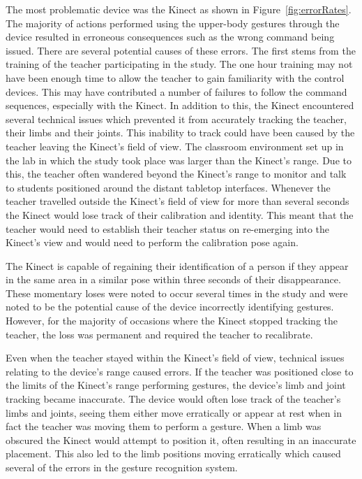 \documentclass[manuscript, review, screen]{acmart}
\begin{document}
The most problematic device was the Kinect as shown in Figure~\ref{fig:errorRates}.
The majority of actions performed using the upper-body gestures through the device resulted in erroneous consequences such as the wrong command being issued.
There are several potential causes of these errors.
The first stems from the training of the teacher participating in the study.
The one hour training may not have been enough time to allow the teacher to gain familiarity with the control devices.
This may have contributed a number of failures to follow the command sequences, especially with the Kinect.
In addition to this, the Kinect encountered several technical issues which prevented it from accurately tracking the teacher, their limbs and their joints.
This inability to track could have been caused by the teacher leaving the Kinect's field of view.
The classroom environment set up in the lab in which the study took place was larger than the Kinect's range.
Due to this, the teacher often wandered beyond the Kinect's range to monitor and talk to students positioned around the distant tabletop interfaces.
Whenever the teacher travelled outside the Kinect's field of view for more than several seconds the Kinect would lose track of their calibration and identity.
This meant that the teacher would need to establish their teacher status on re-emerging into the Kinect's view and would need to perform the calibration pose again.

The Kinect is capable of regaining their identification of a person if they appear in the same area in a similar pose within three seconds of their disappearance.
These momentary loses were noted to occur several times in the study and were noted to be the potential cause of the device incorrectly identifying gestures.
However, for the majority of occasions where the Kinect stopped tracking the teacher, the loss was permanent and required the teacher to recalibrate.

Even when the teacher stayed within the Kinect's field of view, technical issues relating to the device's range caused errors.
If the teacher was positioned close to the limits of the Kinect's range performing gestures, the device's limb and joint tracking became inaccurate.
The device would often lose track of the teacher's limbs and joints, seeing them either move erratically or appear at rest when in fact the teacher was moving them to perform a gesture.
When a limb was obscured the Kinect would attempt to position it, often resulting in an inaccurate placement.
This also led to the limb positions moving erratically which caused several of the errors in the gesture recognition system.
\end{document}
